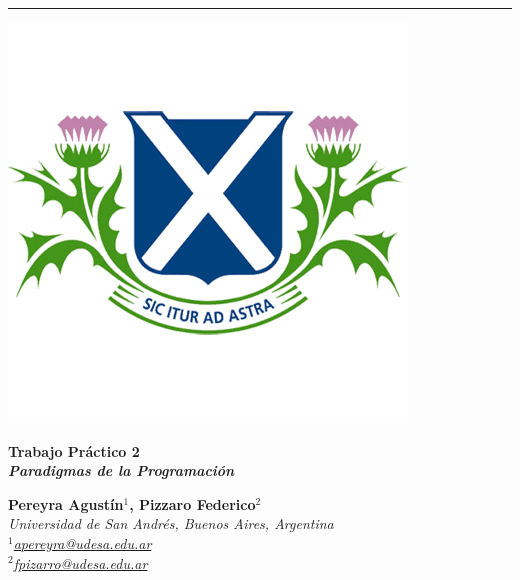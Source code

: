 \documentclass[11pt, a4paper]{article}
\begin{document}
\vspace*{1cm}

{\noindent\rule{\textwidth}{0.5pt}}
\noindent
\begin{minipage}{0.24\textwidth}
    \includegraphics[width=\linewidth]{figures/logo2.png}
\end{minipage}
\hspace{0.02\textwidth}
\begin{minipage}{0.7\textwidth}
    {\fontsize{32}{36}\selectfont\bfseries\color{myblue}\selectfont Trabajo Práctico 2}\\
    {\fontsize{20}{24}\selectfont\bfseries\itshape\color{myblue} Paradigmas de la Programación}
\end{minipage}

\begin{minipage}{0.8\textwidth}
    {\large\textbf{\color{myblue} Pereyra Agustín$^{1}$, Pizzaro Federico$^{2}$}}\\
    {\itshape\small
    Universidad de San Andrés, Buenos Aires, Argentina\\
    $^1$\href{mailto:apereyra@udesa.edu.ar}{apereyra@udesa.edu.ar}\\
    $^2$\href{mailto:fpizarro@udesa.edu.ar}{fpizarro@udesa.edu.ar}
}
\end{minipage}
\vspace{0.5cm}
\end{document}
